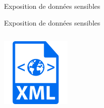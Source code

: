 \documentclass[final,hyperref={pdfpagelabels=false}]{beamer}
\begin{document}
\begin{frame}[t]
\begin{columns}[t]
\begin{column}{.465\textwidth}
\begin{block}{Exposition de données sensibles}
\end{block}

\begin{block}{Exposition de données sensibles}
	\begin{columns}[T]

		\begin{column}{.12\textwidth} %
			\includegraphics[scale=1.35]{xml.png}
		\end{column}


\end{columns}
\end{block}
\end{column}
\end{columns}
\end{frame}
\end{document}

